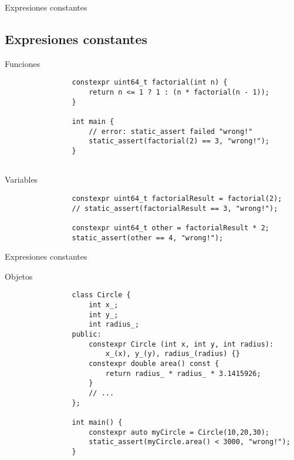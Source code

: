 \documentclass{beamer}
\newcommand{\normalSizeItem}[1] {
  \normalsize{\item #1}
}
\newcommand{\smallCite}[1]{
	\begin{small}
		\cite{#1}	
	\end{small}
}
\begin{document}
		\begin{frame}[fragile]{Expresiones constantes \ttfamily{(constexpr)\smallCite{constexpr}}}	
			\subsection{Expresiones constantes }		
			\begin{itemize}
			
				\normalSizeItem { Funciones }
				\begin{lstlisting}
				constexpr uint64_t factorial(int n) {
					return n <= 1 ? 1 : (n * factorial(n - 1));
				}
				
				int main {
					// error: static_assert failed "wrong!"
					static_assert(factorial(2) == 3, "wrong!");
				}
				
				\end{lstlisting}
				
				\normalSizeItem { Variables }
				\begin{lstlisting}
				constexpr uint64_t factorialResult = factorial(2);
				// static_assert(factorialResult == 3, "wrong!");
			
				constexpr uint64_t other = factorialResult * 2;
				static_assert(other == 4, "wrong!");
				\end{lstlisting}
				
			\end{itemize}
		\end{frame}
		
		\begin{frame}[fragile]{Expresiones constantes }		
			\begin{itemize}
			
				\normalSizeItem { Objetos }
				\begin{lstlisting}
				class Circle {
					int x_;
					int y_;
					int radius_;
				public:
					constexpr Circle (int x, int y, int radius): 
						x_(x), y_(y), radius_(radius) {}
					constexpr double area() const {
						return radius_ * radius_ * 3.1415926;
					}
					// ...
				};
				
				int main() {
					constexpr auto myCircle = Circle(10,20,30);
					static_assert(myCircle.area() < 3000, "wrong!");
				}
				
				\end{lstlisting}
			\end{itemize}
		\end{frame}
		
\end{document}
